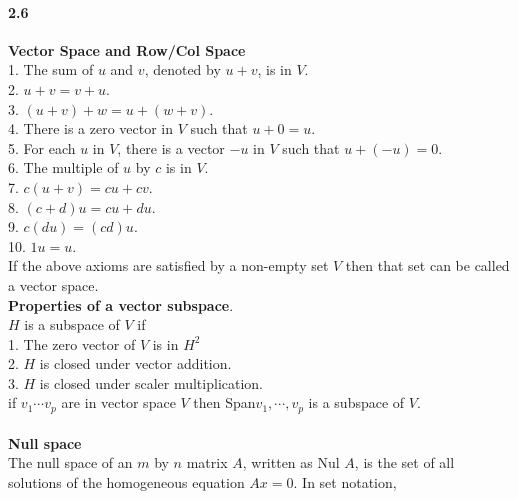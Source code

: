 \documentclass[14pt]{extreport}
\begin{document}
\paragraph{2.6}\textbf{Vector Space and Row/Col Space}\\

1. The sum of $u$ and $v$, denoted by $u+v$, is in $V$.\\

2. $u+v = v+u$.\\

3. $(u+v) + w = u + (w+v)$.\\

4. There is a zero vector in $V$ such that $u+0 = u$.\\

5. For each $u$ in $V$, there is a vector $-u$ in $V$ such that $u + (-u)= 0$.\\

6. The multiple of $u$ by $c$ is in $V$.\\

7. $c(u + v) = cu + cv$.\\

8. $(c + d)u = cu + du$.\\

9. $c(du) = (cd)u$.\\

10. $1u = u$.\\

If the above axioms are satisfied by a non-empty set $V$ then that set can be called a vector space.\\


\textbf{Properties of a vector subspace}.\\

$H$ is a subspace of $V$ if\\

1. The zero vector of $V$ is in $H^2$\\
2. $H$ is closed under vector addition.\\
3. $H$ is closed under scaler multiplication.\\

if $v_1 \cdots v_p$ are in vector space $V$ then Span${v_1, \cdots ,v_p}$ is a subspace of $V$.\\\\

\textbf{Null space}\\

The null space of an $m$ by $n$ matrix $A$, written as Nul $A$, is the set of all solutions of the homogeneous equation $Ax = 0$. In set notation,\\
\end{document}
